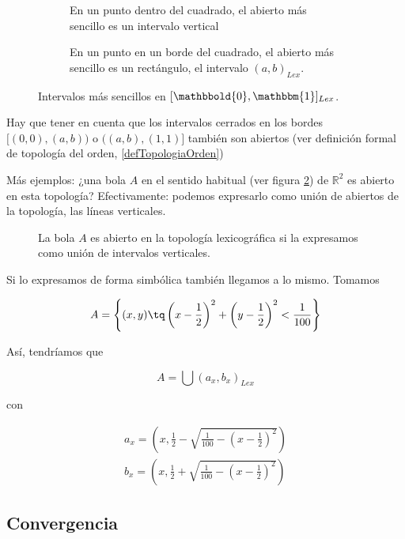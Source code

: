 \documentclass{apuntes}
\begin{document}
\begin{figure}[hbtp]
\centering
\begin{subfigure}[b]{0.4\textwidth}
\caption{En un punto dentro del cuadrado, el abierto más sencillo es un intervalo vertical}
\end{subfigure}
\begin{subfigure}[b]{0.4\textwidth}
\caption{En un punto en un borde del cuadrado, el abierto más sencillo es un rectángulo, el intervalo $(a,b)_{Lex}$.}
\end{subfigure}

\caption{Intervalos más sencillos en $[\mathbbold{0}, \mathbbm{1}]_{Lex}$.}
\label{figIntervalosLex}
\end{figure}

Hay que tener en cuenta que los intervalos cerrados en los bordes $[(0,0), (a, b))$ o $((a,b), (1,1)]$ también son abiertos (ver definición formal de topología del orden, \ref{defTopologiaOrden})

Más ejemplos: ¿una bola $A$ en el sentido habitual (ver figura \ref{figBolaLex}) de $ℝ^2$ es abierto en esta topología? Efectivamente: podemos expresarlo como unión de abiertos de la topología, las líneas verticales.

\begin{figure}[hbtp]
\centering
{}
\caption{La bola $A$ es abierto en la topología lexicográfica si la expresamos como unión de intervalos verticales.}
\label{figBolaLex}
\end{figure}

Si lo expresamos de forma simbólica también llegamos a lo mismo. Tomamos

\[ A = \left\{ (x,y) \tq \left(x-\frac{1}{2}\right)^2 + \left(y-\frac{1}{2}\right)^2 < \frac{1}{100} \right\} \]

Así, tendríamos que

\[ A = \bigcup (a_x, b_x)_{Lex} \]

con

\begin{gather*}
a_x = \left(x, \frac{1}{2} - \sqrt{\frac{1}{100} - \left(x-\frac{1}{2}\right)^2}\right) \\
b_x = \left(x, \frac{1}{2} + \sqrt{\frac{1}{100} - \left(x-\frac{1}{2}\right)^2}\right)
\end{gather*}

\subsection{Convergencia}
\end{document}
